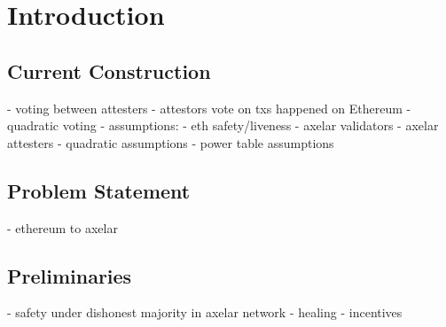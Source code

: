 \section{Introduction}

\subsection{Current Construction}

    - voting between attesters
        - attestors vote on txs happened on Ethereum
        - quadratic voting
    - assumptions:
        - eth safety/liveness
        - axelar validators 
        - axelar attesters 
        - quadratic assumptions 
        - power table assumptions 
\subsection{Problem Statement}
- ethereum to axelar
\subsection{Preliminaries}
- safety under dishonest majority in axelar network
- healing 
- incentives 